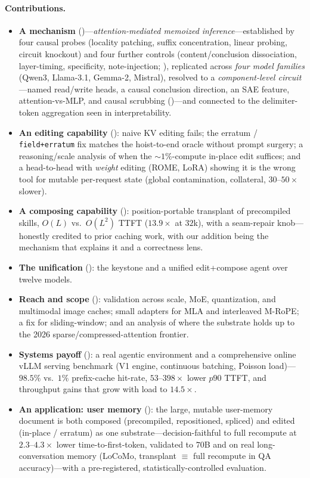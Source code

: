 \paragraph{Contributions.}
\begin{itemize}[leftmargin=1.2em,itemsep=1pt,topsep=2pt]
\item \textbf{A mechanism} ()---\emph{attention-mediated memoized inference}---established
by four causal probes (locality patching, suffix concentration, linear probing, circuit knockout) and four
further controls (content/conclusion dissociation, layer-timing, specificity, note-injection;
), replicated across \emph{four model families} (Qwen3, Llama-3.1, Gemma-2, Mistral),
resolved to a \emph{component-level circuit}---named read/write heads, a causal conclusion direction, an SAE
feature, attention-vs-MLP, and causal scrubbing ()---and connected to the delimiter-token
aggregation seen in interpretability.
\item \textbf{An editing capability} (): naive KV editing fails; the erratum /
\texttt{field+erratum} fix matches the hoist-to-end oracle without prompt surgery; a reasoning/scale
analysis of when the ${\sim}1\%$-compute in-place edit suffices; and a head-to-head with \emph{weight}
editing (ROME, LoRA) showing it is the wrong tool for mutable per-request state (global contamination,
collateral, $30$--$50\times$ slower).
\item \textbf{A composing capability} (): position-portable transplant of precompiled
skills, $O(L)$ vs.\ $O(L^2)$ TTFT ($13.9\times$ at $32$k), with a seam-repair knob---honestly credited to
prior caching work, with our addition being the mechanism that explains it and a correctness lens.
\item \textbf{The unification} (): the keystone and a unified edit+compose agent over
twelve models.
\item \textbf{Reach and scope} (): validation across scale, MoE, quantization, and
multimodal image caches; small adapters for MLA and interleaved M-RoPE; a fix for sliding-window; and an
analysis of where the substrate holds up to the 2026 sparse/compressed-attention frontier.
\item \textbf{Systems payoff} (): a real agentic environment and a comprehensive online
vLLM serving benchmark (V1 engine, continuous batching, Poisson load)---$98.5\%$ vs.\ $1\%$ prefix-cache
hit-rate, $53$--$398\times$ lower $p90$ TTFT, and throughput gains that grow with load to $14.5\times$.
\item \textbf{An application: user memory} (): the large, mutable user-memory
document is both composed (precompiled, repositioned, spliced) and edited (in-place / erratum)
as one substrate---decision-faithful to full recompute at $2.3$--$4.3\times$ lower
time-to-first-token, validated to $70$B and on real long-conversation memory (LoCoMo, transplant
$\equiv$ full recompute in QA accuracy)---with a pre-registered, statistically-controlled evaluation.
\end{itemize}

